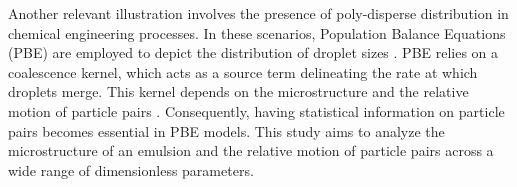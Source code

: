 

Another relevant illustration involves the presence of poly-disperse distribution in chemical engineering processes. In these scenarios, Population Balance Equations (PBE) are employed to depict the distribution of droplet sizes \citep{randolph2012theory}. PBE relies on a coalescence kernel, which acts as a source term delineating the rate at which droplets merge. This kernel depends on the microstructure and the relative motion of particle pairs \citep{chesters1991modelling}. Consequently, having statistical information on particle pairs becomes essential in PBE models. This study aims to analyze the microstructure of an emulsion and the relative motion of particle pairs across a wide range of dimensionless parameters.



